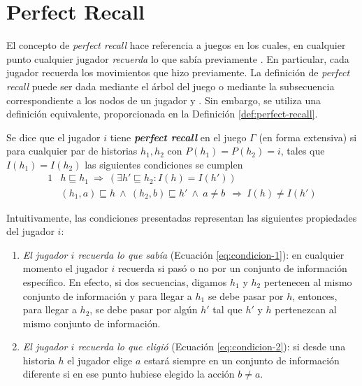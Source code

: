 \section{Perfect Recall}

El concepto de \textit{perfect recall} hace referencia a juegos en los cuales, en cualquier punto cualquier jugador \textit{recuerda} lo que sabía previamente \cite[p.~203]{bib:course-game-theory}. En particular, cada jugador recuerda los movimientos que hizo previamente. La definición de \textit{perfect recall} puede ser dada mediante el árbol del juego \cite{bib:conceptos-basicos} o mediante la subsecuencia correspondiente a los nodos de un jugador \cite[p.~203]{bib:course-game-theory} y \cite[p.~44]{bib:handbook-blai}. Sin embargo, se utiliza una definición equivalente, proporcionada en la Definición \ref{def:perfect-recall}.

\begin{definition}
\label{def:perfect-recall}
Se dice que el jugador $i$ tiene \textbf{\textit{perfect recall}} en el juego $\Gamma$ (en forma extensiva) si para cualquier par de historias $h_1, h_2$ con $P(h_1) = P(h_2) = i$, tales que $I(h_1) = I(h_2)$ las siguientes condiciones se cumplen
\begin{alignat}{1}
& h \sqsubseteq h_1\ \Rightarrow\ (\exists h' \sqsubseteq h_2 : I(h) = I(h') )
\label{eq:condicion-1}\\
& (h_1, a) \sqsubseteq h\  \land\ (h_2, b)\sqsubseteq h'\ \land\ a \neq b\ \  \Rightarrow\ I(h) \neq I(h')
\label{eq:condicion-2}
\end{alignat}
\end{definition}

Intuitivamente, las condiciones presentadas representan las siguientes propiedades del jugador $i$:
\begin{enumerate}[noitemsep]
\item \textit{El jugador $i$ recuerda lo que sabía} (Ecuación \ref{eq:condicion-1}): en cualquier momento el jugador $i$ recuerda si pasó o no por un conjunto de información específico. En efecto, si dos secuencias, digamos $h_1$ y $h_2$ pertenecen al mismo conjunto de información y para llegar a $h_1$ se debe pasar por $h$, entonces, para llegar a $h_2$, se debe pasar por algún $h'$ tal que $h'$ y $h$ pertenezcan al mismo conjunto de información. 

\item \textit{El jugador $i$ recuerda lo que eligió} (Ecuación \ref{eq:condicion-2}): si desde una historia $h$ el jugador elige $a$ estará siempre en un conjunto de información diferente si en ese punto hubiese elegido la acción $b \neq a$.
\end{enumerate}

